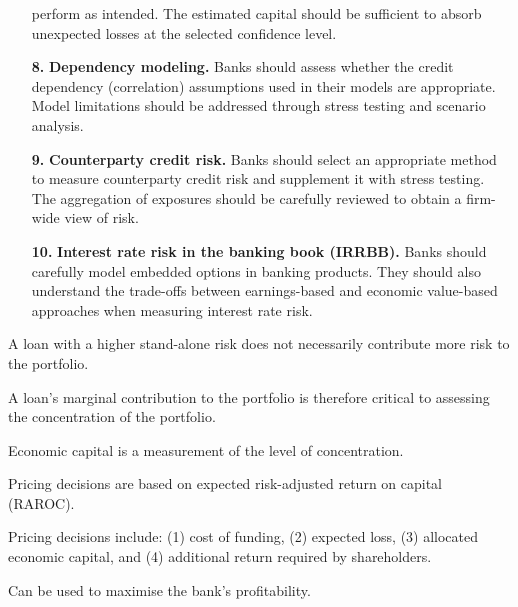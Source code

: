\begin{enumerate}
perform as intended. The estimated capital should be sufficient to absorb
unexpected losses at the selected confidence level.
\item[\textcolor{rust}{\sffamily\bfseries 8.}] \textbf{Dependency modeling.} Banks
should assess whether the credit dependency (correlation) assumptions used in their
models are appropriate. Model limitations should be addressed through stress
testing and scenario analysis.
\item[\textcolor{rust}{\sffamily\bfseries 9.}] \textbf{Counterparty credit risk.}
Banks should select an appropriate method to measure counterparty credit risk and
supplement it with stress testing. The aggregation of exposures should be carefully
reviewed to obtain a firm-wide view of risk.
\item[\textcolor{rust}{\sffamily\bfseries 10.}] \textbf{Interest rate risk in the
banking book (IRRBB).} Banks should carefully model embedded options in banking
products. They should also understand the trade-offs between earnings-based and
economic value-based approaches when measuring interest rate risk.
\end{enumerate}



\begin{checks}
\item A loan with a higher stand-alone risk does not necessarily contribute more
risk to the portfolio.
\item A loan's marginal contribution to the portfolio is therefore critical to
assessing the concentration of the portfolio.
\item Economic capital is a measurement of the level of concentration.
\end{checks}

\begin{checks}
\item Pricing decisions are based on expected risk-adjusted return on capital
(RAROC).
\item Pricing decisions include: (1) cost of funding, (2) expected loss,
(3) allocated economic capital, and (4) additional return required by
shareholders.
\item Can be used to maximise the bank's profitability.
\end{checks}

